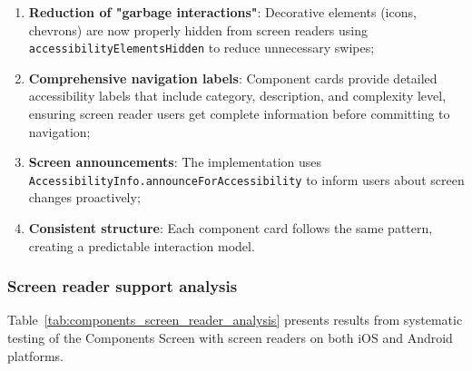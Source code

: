 \begin{enumerate}
    \item \textbf{Reduction of "garbage interactions"}: Decorative elements (icons, chevrons) are now properly hidden from screen readers using \\ \texttt{accessibilityElementsHidden} to reduce unnecessary swipes;
    
    \item \textbf{Comprehensive navigation labels}: Component cards provide detailed accessibility labels that include category, description, and complexity level, ensuring screen reader users get complete information before committing to navigation;
    
    \item \textbf{Screen announcements}: The implementation uses \\ \texttt{AccessibilityInfo.announceForAccessibility} to inform users about screen changes proactively;
    
    \item \textbf{Consistent structure}: Each component card follows the same pattern, creating a predictable interaction model.
\end{enumerate}

\subsubsection{Screen reader support analysis}

Table~\ref{tab:components_screen_reader_analysis} presents results from systematic testing of the Components Screen with screen readers on both iOS and Android platforms.

